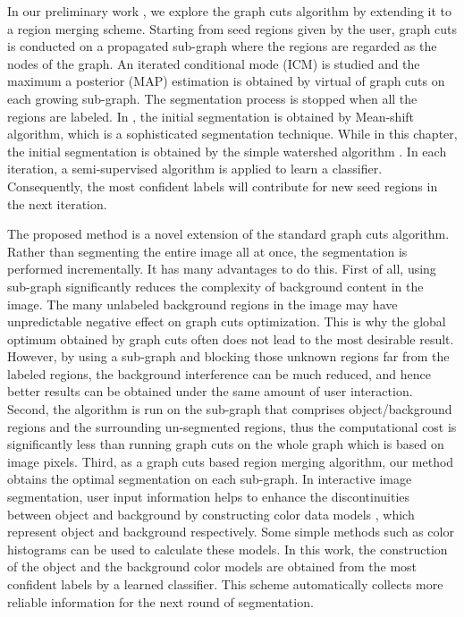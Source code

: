 In our preliminary work \cite{Peng}, we explore the graph cuts algorithm by extending it to a region merging scheme. Starting from seed regions given by the user, graph cuts is conducted on a
propagated sub-graph where the regions are regarded as the nodes of the graph. An iterated conditional mode (ICM) is studied and the maximum a posterior (MAP) estimation is obtained by virtual of graph
cuts on each growing sub-graph. The segmentation process is stopped when all the regions are labeled. In \cite{Peng}, the initial segmentation is obtained by Mean-shift algorithm, which is a
sophisticated segmentation technique.  While in this chapter, the initial segmentation is obtained by the simple watershed algorithm \cite{watershed}. In each iteration, a semi-supervised algorithm is
applied to learn a classifier. Consequently, the most confident labels will contribute for new seed regions in the next iteration.

The proposed method is a novel extension of the standard graph cuts
algorithm. Rather than segmenting the entire image all at once, the
segmentation is performed incrementally. It has many advantages to
do this. First of all, using sub-graph significantly reduces the
complexity of background content in the image. The many unlabeled
background regions in the image may have unpredictable negative
effect on graph cuts optimization. This is why the global optimum
obtained by graph cuts often does not lead to the most desirable
result. However, by using a sub-graph and blocking those unknown
regions far from the labeled regions, the background interference
can be much reduced, and hence better results can be obtained under
the same amount of user interaction. Second, the algorithm is run on
the sub-graph that comprises object/background regions and the
surrounding un-segmented regions, thus the computational cost is
significantly less than running graph cuts on the whole graph which
is based on image pixels. Third, as a graph cuts based region
merging algorithm, our method obtains the optimal segmentation on
each sub-graph. In interactive image segmentation, user input
information helps to enhance the discontinuities between object and
background by constructing color data models \cite{grabcut}, which
represent object and background respectively. Some simple methods
such as color histograms can be used to calculate these models. In
this work, the construction of the object and the background color
models are obtained from the most confident labels by a learned
classifier. This scheme automatically collects more reliable
information for the next round of segmentation.

